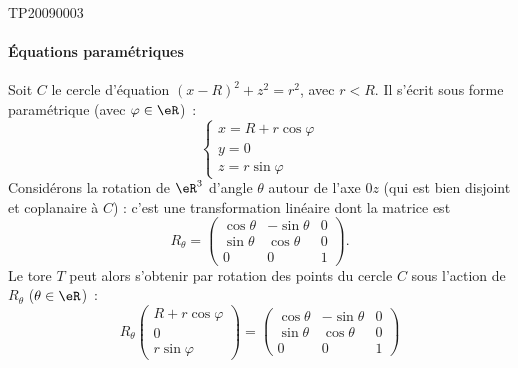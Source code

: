 
\begin{corrige}{TP20090003}




	\paragraph{Équations paramétriques}
	Soit $C$ le cercle d'équation $(x-R)^2 + z^2 = r^2$, avec $r < R$. Il
	s'écrit sous forme paramétrique (avec $\varphi \in \eR$)~:
	\begin{equation*}
		\begin{cases}
			x = R + r\cos \varphi \\
			y = 0                 \\
			z = r \sin \varphi
		\end{cases}
	\end{equation*}
	Considérons la rotation de $\eR^3$ d'angle $\theta$ autour de l'axe
	$0z$ (qui est bien disjoint et coplanaire à $C$) : c'est une
	transformation linéaire dont la matrice est
	\begin{equation*}
		R_\theta =
		\begin{pmatrix}
			\cos \theta & -\sin \theta & 0 \\
			\sin \theta & \cos \theta  & 0 \\
			0           & 0            & 1
		\end{pmatrix}.
	\end{equation*}
	Le tore $T$ peut alors s'obtenir par rotation des points du cercle $C$ sous
	l'action de $R_\theta$ ($\theta \in \eR$)~:
	\begin{equation*}
		R_\theta%
		\begin{pmatrix}
			R + r\cos \varphi \\
			0                 \\
			r \sin \varphi
		\end{pmatrix}
		=
		\begin{pmatrix}
			\cos \theta & -\sin \theta & 0 \\
			\sin \theta & \cos \theta  & 0 \\
			0           & 0            & 1
		\end{pmatrix}

\end{equation*}
\end{corrige}
